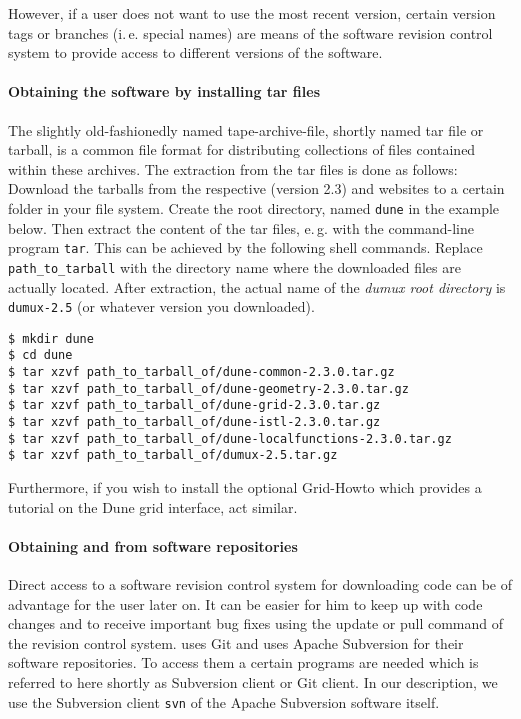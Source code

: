 However, if a user does not want to use the most recent version,
certain version tags or branches (i.\,e. special names) are means 
of the software revision control system to provide access to different versions of the software.

\paragraph{Obtaining the software by installing tar files}
The slightly old-fashionedly named tape-archive-file, shortly named tar file or tarball, is a common file format for distributing collections of files contained within these archives.
The extraction from the tar files is done as follows: 
Download the tarballs from the respective \Dune (version 2.3) and \Dumux websites to a certain folder in your file system.
Create the {\Dune} root directory, named \texttt{dune} in the example below.
Then extract the content of the tar files, e.\,g. with the command-line program \texttt{tar}.
This can be achieved by the following shell commands. Replace \texttt{path\_to\_tarball} with the directory name where the downloaded files are actually located.
After extraction, the actual name of the \emph{dumux root directory} is \texttt{dumux-2.5}
(or whatever version you downloaded).

\begin{lstlisting}[style=Bash]
$ mkdir dune
$ cd dune
$ tar xzvf path_to_tarball_of/dune-common-2.3.0.tar.gz 
$ tar xzvf path_to_tarball_of/dune-geometry-2.3.0.tar.gz 
$ tar xzvf path_to_tarball_of/dune-grid-2.3.0.tar.gz 
$ tar xzvf path_to_tarball_of/dune-istl-2.3.0.tar.gz 
$ tar xzvf path_to_tarball_of/dune-localfunctions-2.3.0.tar.gz 
$ tar xzvf path_to_tarball_of/dumux-2.5.tar.gz
\end{lstlisting}

Furthermore, if you wish to install the optional \Dune Grid-Howto which provides a tutorial
on the Dune grid interface, act similar.

\paragraph{Obtaining \Dune and \Dumux from software repositories} 
Direct access to a software revision control system for downloading code can be of advantage for the user later on. 
It can be easier for him to keep up with code changes and to receive important bug fixes using
the update or pull command of the revision control system. \Dune uses Git and \Dumux uses Apache
Subversion for their software repositories. To access them a certain programs are needed which
is referred to here shortly as Subversion client or Git client. In our description, we use the
Subversion client \texttt{svn} of the Apache Subversion software itself.

